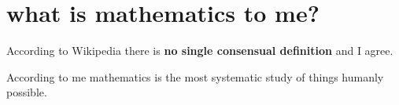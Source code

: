 \documentclass[./main.tex]{subfiles}
\begin{document}
\chapter{what is mathematics to me?}

According to Wikipedia there is \textbf{no single consensual definition} and I agree.
\begin{definition}
  \label{def:mathematics}
  According to me mathematics is the most systematic study of things humanly possible.
\end{definition}
\end{document}
